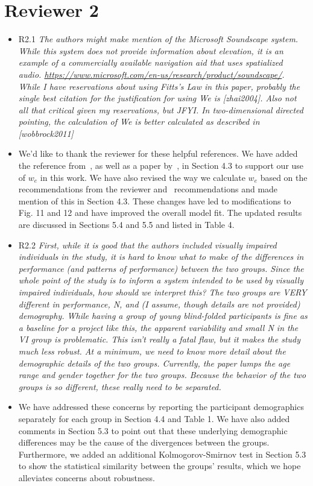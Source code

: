 \documentclass{scrartcl}
\begin{document}
\section*{Reviewer 2}


\begin{itemize}

  \item R2.1 \textit{The authors might make mention of the Microsoft Soundscape system. While this system does not provide information about elevation, it is an example of a commercially available navigation aid that uses spatialized audio. \url{https://www.microsoft.com/en-us/research/product/soundscape/}. While I have reservations about using Fitts’s Law in this paper, probably the single best citation for the justification for using We is [zhai2004]. Also not all that critical given my reservations, but JFYI. In two-dimensional directed pointing, the calculation of We is better calculated as described in [wobbrock2011]}
  \item[] We'd like to thank the reviewer for these helpful references. 
    We have added the reference from~\cite{zhai2004speed}, as well as a paper by~\cite{kabbash1995prince}, in Section 4.3 to support our use of $w_e$ in this work.
    We have also revised the way we calculate $w_e$ based on the recommendations from the reviewer and~\cite{wobbrock2011effects} recommendations and made mention of this in Section 4.3. 
    These changes have led to modifications to Fig. 11 and 12 and have improved the overall model fit.
    The updated results are discussed in Sections 5.4 and 5.5 and listed in Table 4.
    
  \item R2.2 \textit{First, while it is good that the authors included visually impaired individuals in the study, it is hard to know what to make of the differences in performance (and patterns of performance) between the two groups. Since the whole point of the study is to inform a system intended to be used by visually impaired individuals, how should we interpret this? The two groups are VERY different in performance, N, and (I assume, though details are not provided) demography. While having a group of young blind-folded participants is fine as a baseline for a project like this, the apparent variability and small N in the VI group is problematic. This isn’t really a fatal flaw, but it makes the study much less robust. At a minimum, we need to know more detail about the demographic details of the two groups. Currently, the paper lumps the age range and gender together for the two groups. Because the behavior of the two groups is so different, these really need to be separated.}
  \item[] We have addressed these concerns by reporting the participant demographics separately for each group in Section 4.4 and Table 1. 
    We have also added comments in Section 5.3 to point out that these underlying demographic differences may be the cause of the divergences between the groups.  
    Furthermore, we added an additional Kolmogorov-Smirnov test in Section 5.3 to show the statistical similarity between the groups' results, which we hope alleviates concerns about robustness.


\end{itemize}
\end{document}
